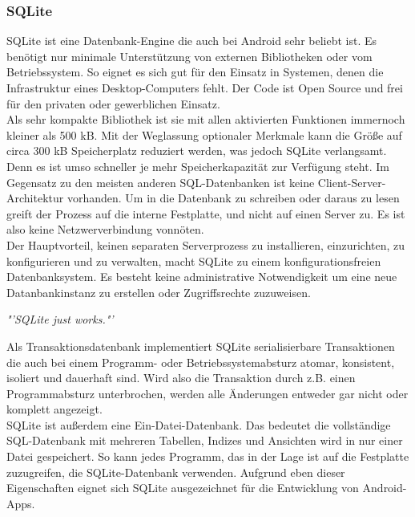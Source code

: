 \subsubsection{SQLite}
SQLite ist eine Datenbank-Engine die auch bei Android sehr beliebt ist. Es benötigt nur minimale Unterstützung von externen Bibliotheken oder vom Betriebssystem. So eignet es sich gut für den Einsatz in Systemen, denen die Infrastruktur eines Desktop-Computers fehlt. Der Code ist Open Source und frei für den privaten oder gewerblichen Einsatz.\\
Als sehr kompakte Bibliothek ist sie mit allen aktivierten Funktionen immernoch kleiner als 500 kB. Mit der Weglassung optionaler Merkmale kann die Größe auf circa 300 kB Speicherplatz reduziert werden, was jedoch SQLite verlangsamt. Denn es ist umso schneller je mehr Speicherkapazität zur Verfügung steht.
Im Gegensatz zu den meisten anderen \gls{SQL}-Datenbanken ist keine Client-Server-Architektur vorhanden. Um in die Datenbank zu schreiben oder daraus zu lesen greift der Prozess auf die interne Festplatte, und nicht auf einen Server zu. Es ist also keine Netzwerverbindung vonnöten. \\
Der Hauptvorteil, keinen separaten Serverprozess zu installieren, einzurichten, zu konfigurieren und zu verwalten, macht SQLite zu einem konfigurationsfreien Datenbanksystem. Es besteht keine administrative Notwendigkeit um eine neue Datanbankinstanz zu erstellen oder Zugriffsrechte zuzuweisen. 
\begin{center}
\textit{\color{gray}"'SQLite just works."'}\hspace{9pt}\cite{sqlitea}
\end{center}
Als Transaktionsdatenbank implementiert SQLite serialisierbare Transaktionen die auch bei einem Programm- oder Betriebssystemabsturz atomar, konsistent, isoliert und dauerhaft sind. Wird also die Transaktion durch z.B. einen Programmabsturz unterbrochen, werden alle Änderungen entweder gar nicht oder komplett angezeigt.\\ 
SQLite ist außerdem eine Ein-Datei-Datenbank. Das bedeutet die vollständige \gls{SQL}-Datenbank mit mehreren Tabellen, Indizes und Ansichten wird in nur einer Datei gespeichert. So kann jedes Programm, das in der Lage ist auf die Festplatte zuzugreifen, die SQLite-Datenbank verwenden. \cite{sqlite} Aufgrund eben dieser Eigenschaften eignet sich SQLite ausgezeichnet für die Entwicklung von Android-\glspl{App}.
